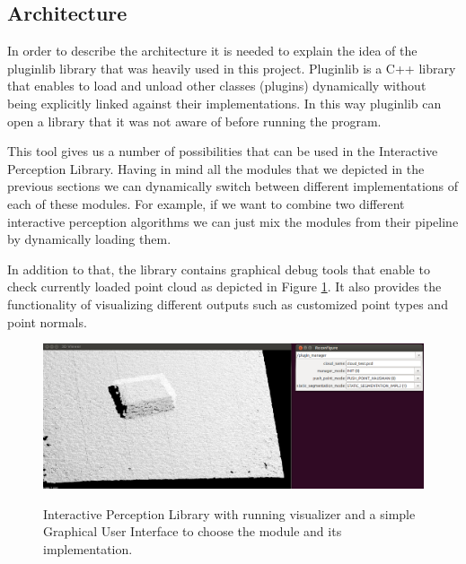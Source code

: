 \subsection{Architecture}

In order to describe the architecture it is needed to explain the idea of the pluginlib library that was heavily used in this project. Pluginlib is a C++ library that enables to load and unload other classes (plugins) dynamically without being explicitly linked against their implementations. In this way pluginlib can open a library that it was not aware of before running the program. 

This tool gives us a number of possibilities that can be used in the Interactive Perception Library. Having in mind all the modules that we depicted in the previous sections we can dynamically switch between different implementations of each of these modules. For example, if we want to combine two different interactive perception algorithms we can just mix the modules from their pipeline by dynamically loading them. 

In addition to that, the library contains graphical debug tools that enable to check currently loaded point cloud as depicted in Figure \ref{fig:ipl}. It also provides the functionality of visualizing different outputs such as customized point types and point normals.

\begin{figure}

{\includegraphics[width=1.1\columnwidth]{figures/ipl.png}}

\caption{Interactive Perception Library with running visualizer and a simple Graphical User Interface to choose the module and its implementation.}
\label{fig:ipl}
\end{figure}

